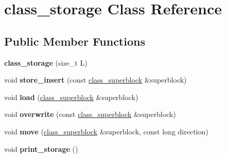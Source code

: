 \hypertarget{classclass__storage}{}\section{class\+\_\+storage Class Reference}
\label{classclass__storage}
\subsection*{Public Member Functions}
\begin{DoxyCompactItemize}
\item 
{\bfseries class\+\_\+storage} (size\+\_\+t L)\hypertarget{classclass__storage_ab5d56dcc648e1c5958152c4ecbaa4752}{}\label{classclass__storage_ab5d56dcc648e1c5958152c4ecbaa4752}

\item 
void {\bfseries store\+\_\+insert} (const \hyperlink{classclass__superblock}{class\+\_\+superblock} \&superblock)\hypertarget{classclass__storage_a27a5109b1b38574b4b3b4587198fb297}{}\label{classclass__storage_a27a5109b1b38574b4b3b4587198fb297}

\item 
void {\bfseries load} (\hyperlink{classclass__superblock}{class\+\_\+superblock} \&superblock)\hypertarget{classclass__storage_a01ac2b3e1bbbc232b5f9c1e2876b2d79}{}\label{classclass__storage_a01ac2b3e1bbbc232b5f9c1e2876b2d79}

\item 
void {\bfseries overwrite} (const \hyperlink{classclass__superblock}{class\+\_\+superblock} \&superblock)\hypertarget{classclass__storage_a99c64ce93ad4a1613b55ecbb0847846e}{}\label{classclass__storage_a99c64ce93ad4a1613b55ecbb0847846e}

\item 
void {\bfseries move} (\hyperlink{classclass__superblock}{class\+\_\+superblock} \&superblock, const long direction)\hypertarget{classclass__storage_a4f99c767232625ace388668ce5118d7c}{}\label{classclass__storage_a4f99c767232625ace388668ce5118d7c}

\item 
void {\bfseries print\+\_\+storage} ()\hypertarget{classclass__storage_a1148311a7eaf7ecbc3710502837ecaf0}{}\label{classclass__storage_a1148311a7eaf7ecbc3710502837ecaf0}

\end{DoxyCompactItemize}

